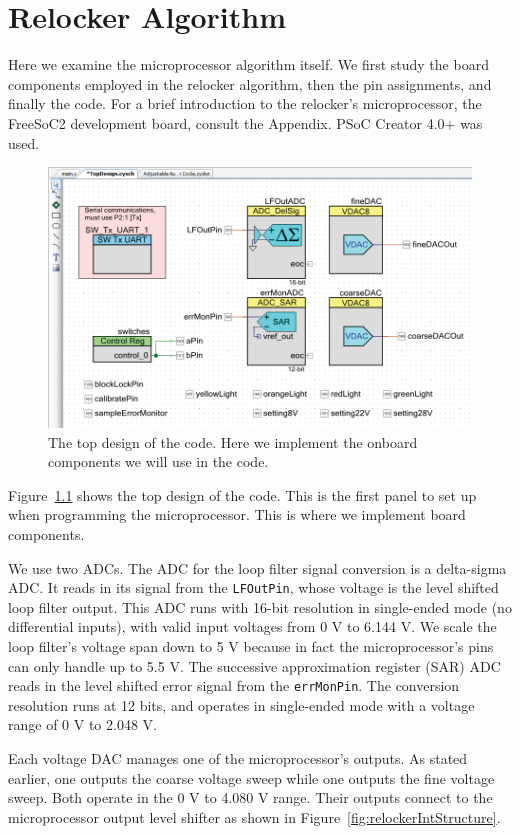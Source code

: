 \documentclass[10pt]{report}
\newcommand{\LFOutPin}[0] {\texttt{LFOutPin}}
\newcommand{\errMonPin}[0] {\texttt{errMonPin}}
\begin{document}
\chapter{Relocker Algorithm}\label{chap:relockerAlgorithm}

Here we examine the microprocessor algorithm itself. We first study the board components employed in the relocker algorithm, then the pin assignments, and finally the code. For a brief introduction to the relocker's microprocessor, the FreeSoC2 development board, consult the Appendix. PSoC Creator 4.0+ was used.

\begin{figure}[h]
    \centering
    \includegraphics[width=0.75\columnwidth]{includes/relockerTopDesign.png}
    \caption{The top design of the code. Here we implement the onboard components we will use in the code.}
    \label{fig:relockerTopDesign}
\end{figure}

Figure~\ref{fig:relockerTopDesign} shows the top design of the code. This is the first panel to set up when programming the microprocessor. This is where we implement board components.

We use two ADCs. The ADC for the loop filter signal conversion is a delta-sigma ADC. It reads in its signal from the \LFOutPin, whose voltage is the level shifted loop filter output. This ADC runs with 16-bit resolution in single-ended mode (no differential inputs), with valid input voltages from 0 V to 6.144 V. We scale the loop filter's voltage span down to 5 V because in fact the microprocessor's pins can only handle up to 5.5 V. The successive approximation register (SAR) ADC reads in the level shifted error signal from the \errMonPin. The conversion resolution runs at 12 bits, and operates in single-ended mode with a voltage range of 0 V to 2.048 V.

Each voltage DAC manages one of the microprocessor's outputs. As stated earlier, one outputs the coarse voltage sweep while one outputs the fine voltage sweep. Both operate in the 0 V to 4.080 V range. Their outputs connect to the microprocessor output level shifter as shown in Figure~\ref{fig:relockerIntStructure}.
\end{document}
